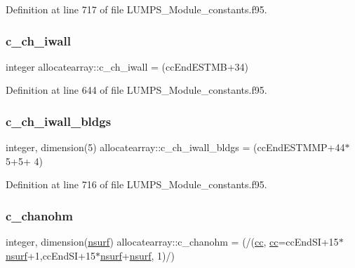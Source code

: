 Definition at line 717 of file L\+U\+M\+P\+S\+\_\+\+Module\+\_\+constants.\+f95.

\mbox{\label{namespaceallocatearray_aba6715fe7d1cb112ef0eeb20541af378}} 
\subsubsection{\texorpdfstring{c\+\_\+ch\+\_\+iwall}{c\_ch\_iwall}}
{\footnotesize\ttfamily integer allocatearray\+::c\+\_\+ch\+\_\+iwall = (cc\+End\+E\+S\+T\+MB+34)}



Definition at line 644 of file L\+U\+M\+P\+S\+\_\+\+Module\+\_\+constants.\+f95.

\mbox{\label{namespaceallocatearray_a156720ee5527b3a9701d9ad18698e8b6}} 
\subsubsection{\texorpdfstring{c\+\_\+ch\+\_\+iwall\+\_\+bldgs}{c\_ch\_iwall\_bldgs}}
{\footnotesize\ttfamily integer, dimension(5) allocatearray\+::c\+\_\+ch\+\_\+iwall\+\_\+bldgs = (cc\+End\+E\+S\+T\+M\+MP+44$\ast$5+5+ 4)}



Definition at line 716 of file L\+U\+M\+P\+S\+\_\+\+Module\+\_\+constants.\+f95.

\mbox{\label{namespaceallocatearray_a4ceb63320f23499a78df99d33a600cda}} 
\subsubsection{\texorpdfstring{c\+\_\+chanohm}{c\_chanohm}}
{\footnotesize\ttfamily integer, dimension(\hyperlink{namespaceallocatearray_acd22f92a06f7e9a2a91426b3dc99fdb0}{nsurf}) allocatearray\+::c\+\_\+chanohm = (/(\hyperlink{namespaceallocatearray_ac863c81704eb507dee10f5e10741e10c}{cc}, \hyperlink{namespaceallocatearray_ac863c81704eb507dee10f5e10741e10c}{cc}=cc\+End\+SI+15$\ast$\hyperlink{namespaceallocatearray_acd22f92a06f7e9a2a91426b3dc99fdb0}{nsurf}+1,cc\+End\+SI+15$\ast$\hyperlink{namespaceallocatearray_acd22f92a06f7e9a2a91426b3dc99fdb0}{nsurf}+\hyperlink{namespaceallocatearray_acd22f92a06f7e9a2a91426b3dc99fdb0}{nsurf}, 1)/)}



